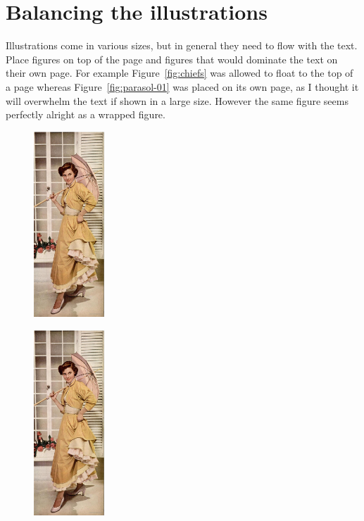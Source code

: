 \section{Balancing the illustrations}

Illustrations come in various sizes, but in general they need to flow with the text. Place figures on top of the page and figures that would dominate the text on their own page. For example Figure~\ref{fig:chiefs} was allowed to float to the top of a page whereas Figure~\ref{fig:parasol-01} was placed on its own page, as I thought it will overwhelm the text if shown in a large size. However the same figure seems perfectly alright as a wrapped figure.

\begin{texexample}{}{}
\begin{figure}
    \includegraphics[width=75pt]{./images/parasol-01.jpg}
 \end{figure}
\lipsum[1-2]
\begin{figure}
    \includegraphics[width=75pt]{./images/parasol-01.jpg}
 \end{figure}
\lipsum[1-2]
\end{texexample}



